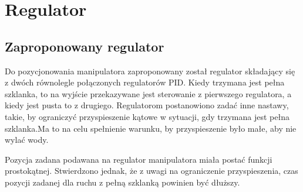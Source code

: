 \chapter{Regulator}
\label{cha:regulator}

\section{Zaproponowany regulator}
Do pozycjonowania manipulatora zaproponowany został regulator składający się z dwóch równolegle połączonych regulatorów PID. Kiedy trzymana jest pełna szklanka, to na wyjście przekazywane jest sterowanie z pierwszego regulatora, a kiedy jest pusta to z drugiego. Regulatorom postanowiono zadać inne nastawy, takie, by ograniczyć przyspieszenie kątowe w sytuacji, gdy trzymana jest pełna szklanka.Ma to na celu spełnienie warunku, by przyspieszenie było małe, aby nie wylać wody.

Pozycja zadana podawana na regulator manipulatora miała postać funkcji prostokątnej. Stwierdzono jednak, że z uwagi na ograniczenie przyspieszenia, czas pozycji zadanej dla ruchu z pełną szklanką powinien być dłuższy.